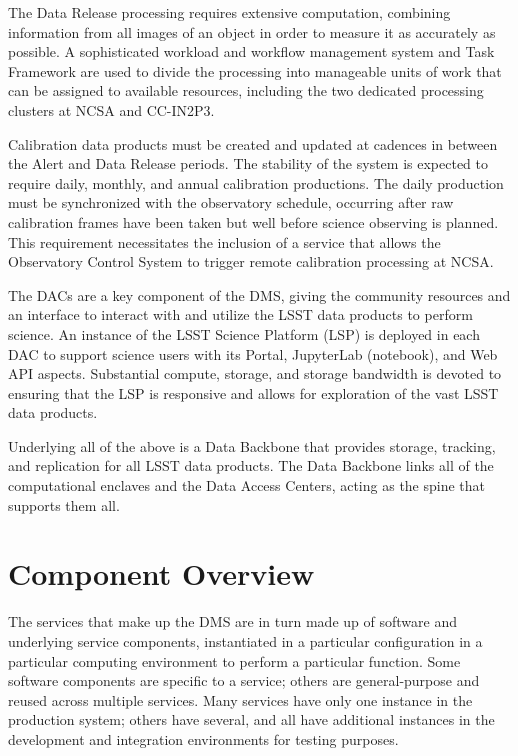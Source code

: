 \documentclass[DM,lsstdraft,toc]{lsstdoc}
\begin{document}
The Data Release processing requires extensive computation, combining
information from all images of an object in order to measure it as
accurately as possible.  A sophisticated workload and workflow management
system and Task Framework are used to divide the processing into
manageable units of work that can be assigned to available resources,
including the two dedicated processing clusters at NCSA and CC-IN2P3.

Calibration data products must be created and updated at cadences in between
the Alert and Data Release periods.  The stability of the system is expected to
require daily, monthly, and annual calibration productions.  The daily
production must be synchronized with the observatory schedule, occurring after
raw calibration frames have been taken but well before science observing is
planned.  This requirement necessitates the inclusion of a service that allows
the Observatory Control System to trigger remote calibration processing at
NCSA.

The DACs are a key component of the DMS, giving the community resources and an
interface to interact with and utilize the LSST data products to perform
science.  An instance of the LSST Science Platform (LSP) is deployed in each
DAC to support science users with its Portal, JupyterLab (notebook), and Web
API aspects.  Substantial compute, storage, and storage bandwidth is devoted to
ensuring that the LSP is responsive and allows for exploration of the vast
LSST data products.

Underlying all of the above is a Data Backbone that provides storage, tracking,
and replication for all LSST data products.  The Data Backbone links all of the
computational enclaves and the Data Access Centers, acting as the spine that
supports them all.



\section{Component Overview}\label{component-overview}

The services that make up the DMS are in turn made up of software and
underlying service components, instantiated in a particular
configuration in a particular computing environment to perform a
particular function. Some software components are specific to a service;
others are general-purpose and reused across multiple services. Many
services have only one instance in the production system; others have
several, and all have additional instances in the development and
integration environments for testing purposes.
\end{document}
